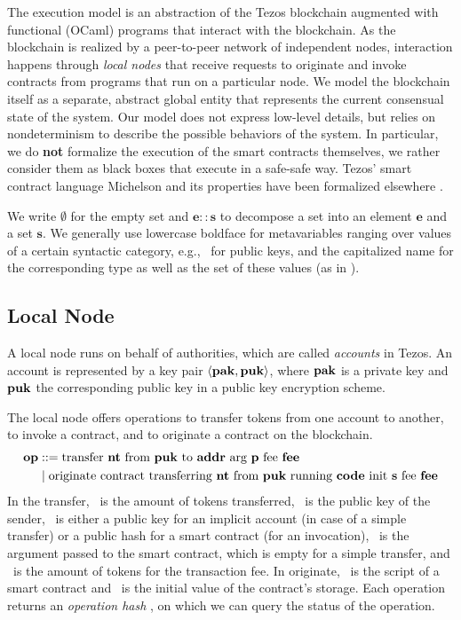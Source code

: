 \documentclass[a4paper]{llncs}
\begin{document}
The execution model is an abstraction of the Tezos blockchain \cite{Tezos}
augmented with functional (OCaml) programs that interact with the
blockchain. As the blockchain is realized by a peer-to-peer network of
independent nodes, interaction happens through
\emph{local nodes} that receive requests to originate and invoke
contracts from programs that run on a particular node. We model the blockchain
itself as a separate, abstract global entity that represents the
current consensual state of the system. Our model does not express
low-level details, but relies on nondeterminism to describe
the possible behaviors of the system. In particular, we do
\textbf{not} formalize the execution of the smart contracts
themselves, we rather consider them as black boxes that execute in a
safe-safe way. Tezos' smart contract language Michelson and its
properties have been formalized elsewhere \cite{type-safe-michelson}.

We write $\emptyset$ for the empty set and $\mathbf{e :: s}$ to
decompose a set into an element $\mathbf{e}$ and a set
$\mathbf{s}$. We generally use lowercase boldface for metavariables
ranging over values of a certain syntactic category, e.g., \PUK\ for
public keys, and the capitalized name for the
corresponding type as well as the set of these values (as in \TPUK).

\subsection{Local Node}
\label{sec:local-node}

A local node runs on behalf of authorities, which are called
\emph{accounts} in Tezos. An account is represented by a key pair $\Angle{
  \PAK, \PUK
} $, where $\PAK$ is a private key and $\PUK$ the corresponding public
key in a public key encryption scheme.

The local node offers operations to transfer tokens from one account
to another, to invoke a contract, and to originate a contract on the blockchain.
\begin{align*}
  \OP &::= \TRANSFER[\PARAMETER]\NTEZ\PUK\ADDR\MTEZ
  \\&\mid \ORIGINATE\NTEZ\PUK\CODE\INIT\MTEZ
\end{align*}
In the transfer, \NTEZ\ is the amount of tokens transferred, \PUK\ is the public key of the
sender, \ADDR\ is either a public 
key for an implicit account (in case of a simple transfer)  or a
public hash for a smart contract (for an invocation), \PARAMETER\ is
the argument passed to the smart contract, 
which is empty for a simple transfer, and \MTEZ\ is
the amount of tokens for the transaction fee. In originate,  \CODE\ is
the script of a smart contract and \INIT\ is the initial value of the
contract's storage. Each operation returns an \emph{operation hash}
\OPH, on which we can query the status of the operation.
\end{document}
